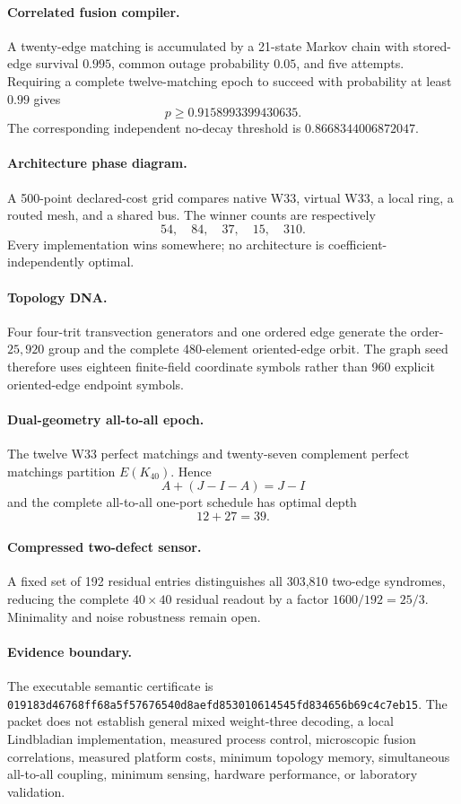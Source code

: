 \paragraph{Correlated fusion compiler.}
A twenty-edge matching is accumulated by a 21-state Markov chain with stored-edge survival $0.995$, common outage probability $0.05$, and five attempts.  Requiring a complete twelve-matching epoch to succeed with probability at least $0.99$ gives
\[
p\ge0.9158993399430635.
\]
The corresponding independent no-decay threshold is $0.8668344006872047$.

\paragraph{Architecture phase diagram.}
A 500-point declared-cost grid compares native W33, virtual W33, a local ring, a routed mesh, and a shared bus.  The winner counts are respectively
\[
54,\quad84,\quad37,\quad15,\quad310.
\]
Every implementation wins somewhere; no architecture is coefficient-independently optimal.

\paragraph{Topology DNA.}
Four four-trit transvection generators and one ordered edge generate the order-$25{,}920$ group and the complete 480-element oriented-edge orbit.  The graph seed therefore uses eighteen finite-field coordinate symbols rather than 960 explicit oriented-edge endpoint symbols.

\paragraph{Dual-geometry all-to-all epoch.}
The twelve W33 perfect matchings and twenty-seven complement perfect matchings partition $E(K_{40})$.  Hence
\[
A+(J-I-A)=J-I
\]
and the complete all-to-all one-port schedule has optimal depth
\[
12+27=39.
\]

\paragraph{Compressed two-defect sensor.}
A fixed set of 192 residual entries distinguishes all 303,810 two-edge syndromes, reducing the complete $40\times40$ residual readout by a factor $1600/192=25/3$.  Minimality and noise robustness remain open.

\paragraph{Evidence boundary.}
The executable semantic certificate is
\texttt{019183d46768ff68a5f57676540d8aefd853010614545fd834656b69c4c7eb15}.
The packet does not establish general mixed weight-three decoding, a local Lindbladian implementation, measured process control, microscopic fusion correlations, measured platform costs, minimum topology memory, simultaneous all-to-all coupling, minimum sensing, hardware performance, or laboratory validation.
